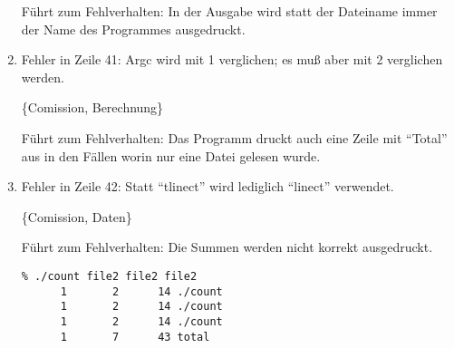\begin{enumerate}
F\"uhrt zum Fehlverhalten:
In der Ausgabe wird statt der Dateiname immer der Name des
Programmes ausgedruckt. 


\item Fehler in Zeile 41: Argc wird mit 1 verglichen; es mu{\ss} aber mit 2
verglichen werden.

\{Comission, Berechnung\}

F\"uhrt zum Fehlverhalten:
Das Programm druckt auch eine Zeile mit ``Total'' aus in den
F\"allen worin nur eine Datei gelesen wurde.


\item Fehler in Zeile 42: Statt ``tlinect'' wird lediglich ``linect''
verwendet. 

\{Comission, Daten\}

F\"uhrt zum Fehlverhalten:
Die Summen werden nicht korrekt ausgedruckt.
\begin{verbatim}
% ./count file2 file2 file2
      1       2      14 ./count
      1       2      14 ./count
      1       2      14 ./count
      1       7      43 total
\end{verbatim}



\end{enumerate}
